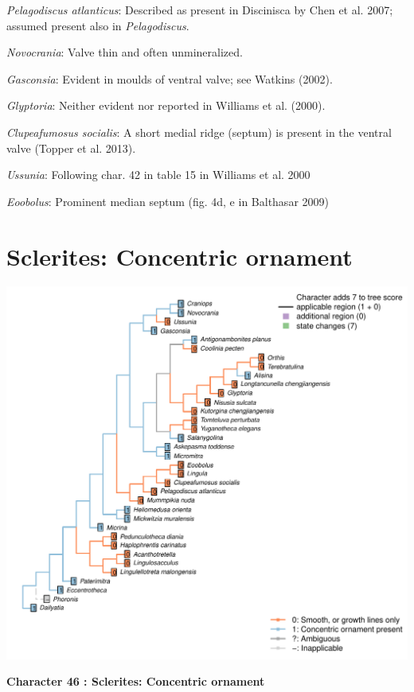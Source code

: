 \documentclass[]{book}
\theoremstyle{definition}
\theoremstyle{definition}
\theoremstyle{definition}
\theoremstyle{remark}
\begin{document}
\emph{Pelagodiscus atlanticus}: Described as present in Discinisca by
Chen et al. 2007; assumed present also in \emph{Pelagodiscus}.

\emph{Novocrania}: Valve thin and often unmineralized.

\emph{Gasconsia}: Evident in moulds of ventral valve; see Watkins
(2002).

\emph{Glyptoria}: Neither evident nor reported in Williams et al.
(2000).

\emph{Clupeafumosus socialis}: A short medial ridge (septum) is present
in the ventral valve (Topper et al. 2013).

\emph{Ussunia}: Following char. 42 in table 15 in Williams et al. 2000

\emph{Eoobolus}: Prominent median septum (fig. 4d, e in Balthasar 2009)

\hypertarget{sclerites-concentric-ornament}{%
\section*{Sclerites: Concentric
ornament}\label{sclerites-concentric-ornament}}

\includegraphics{Brachiopod_phylogeny_files/figure-latex/unnamed-chunk-5-46.pdf}

\textbf{Character 46 : Sclerites: Concentric ornament }
\end{document}
